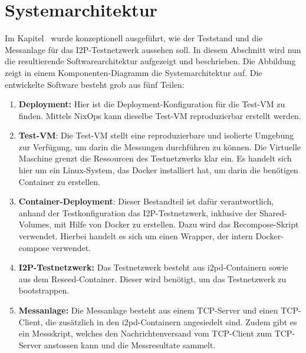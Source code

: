 \section{Systemarchitektur}\label{sec:systemarchitektur}

Im Kapitel~ wurde konzeptionell ausgeführt, wie der Teststand und die Messanlage für das I2P-Testnetzwerk aussehen soll.
In diesem Abschnitt wird nun die resultierende Softwarearchitektur aufgezeigt und beschrieben.
Die Abbildung~ zeigt in einem Komponenten-Diagramm die Systemarchitektur auf.
Die entwickelte Software besteht grob aus fünf Teilen:

\begin{enumerate}
    \item \textbf{Deployment:} Hier ist die Deployment-Konfiguration für die Test-VM zu finden. Mittels NixOps kann dieselbe Test-VM reproduzierbar erstellt werden.
    \item \textbf{Test-VM}: Die Test-VM stellt eine reproduzierbare und isolierte Umgebung zur Verfügung, um darin die Messungen durchführen zu können.
     Die Virtuelle Maschine grenzt die Ressourcen des Testnetzwerks klar ein.
     Es handelt sich hier um ein Linux-System, das Docker installiert hat,
	 um darin die benötigen Container zu erstellen.
    \item \textbf{Container-Deployment}: Dieser Bestandteil ist dafür verantwortlich, anhand der Testkonfiguration das I2P-Testnetzwerk, inklusive der Shared-Volumes, mit Hilfe von Docker zu erstellen. Dazu wird das Recompose-Skript verwendet.
	 Hierbei handelt es sich um einen Wrapper, der intern Docker-compose verwendet.
    \item \textbf{I2P-Testnetzwerk:} Das Testnetzwerk besteht aus i2pd-Containern sowie aus dem Reseed-Container. Dieser wird benötigt, um das Testnetzwerk zu bootstrappen.
    \item \textbf{Messanlage:} Die Messanlage besteht aus einem TCP-Server und einen TCP-Client, die zusätzlich in den i2pd-Containern angesiedelt sind.
        Zudem gibt es ein Messskript, welches den Nachrichtenversand vom TCP-Client zum TCP-Server anstossen kann und die Messresultate sammelt.
\end{enumerate}


